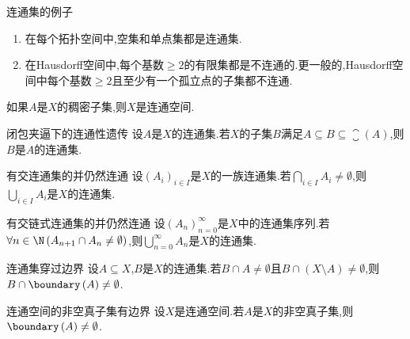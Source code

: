 \begin{example}{连通集的例子}{}
	\begin{enumerate}
		\item 在每个拓扑空间中,空集和单点集都是连通集.
		\item 在Hausdorff空间中,每个基数$\geq 2$的有限集都是不连通的.更一般的,Hausdorff空间中每个基数$\geq 2$且至少有一个孤立点的子集都不连通.
	\end{enumerate}
\end{example}

\begin{remark}{}{}
	如果$A$是$X$的稠密子集,则$X$是连通空间.
\end{remark}

\begin{proposition}{闭包夹逼下的连通性遗传}{}
	设$A$是$X$的连通集.若$X$的子集$B$满足$A\subseteq B\subseteq\closure\left(A\right)$,则$B$是$A$的连通集.
\end{proposition}

\begin{proposition}{有交连通集的并仍然连通}{}
	设$\left(A_{i}\right)_{i\in I}$是$X$的一族连通集.若$\bigcap\limits_{i\in I}A_{i}\neq\emptyset$,则$\bigcup\limits_{i\in I}A_{i}$是$X$的连通集.
\end{proposition}

\begin{corollary}{有交链式连通集的并仍然连通}{}
	设$\left(A_{n}\right)_{n=0}^{\infty}$是$X$中的连通集序列.若$\forall n\in\N\left(A_{n+1}\cap A_{n}\neq\emptyset\right)$,则$\bigcup\limits_{n=0}^{\infty}A_{n}$是$X$的连通集.
\end{corollary}

\begin{proposition}{连通集穿过边界}{}
	设$A\subseteq X$,$B$是$X$的连通集.若$B\cap A\neq\emptyset$且$B\cap\left(X\setminus A\right)\neq\emptyset$,则$B\cap\boundary\left(A\right)\neq\emptyset$.
\end{proposition}

\begin{corollary}{连通空间的非空真子集有边界}{}
	设$X$是连通空间.若$A$是$X$的非空真子集,则$\boundary\left(A\right)\neq\emptyset$.
\end{corollary}